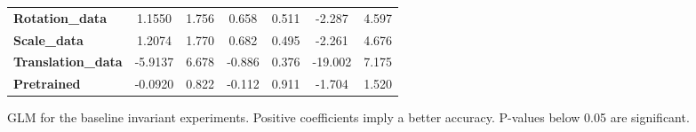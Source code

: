 \begin{figure}[!htb]
\begin{center}
\begin{tabular}{lcccccc}
			\textbf{Rotation\_data}    &       1.1550  &        1.756     &     0.658  &         0.511        &       -2.287    &        4.597     \\
			\textbf{Scale\_data}       &       1.2074  &        1.770     &     0.682  &         0.495        &       -2.261    &        4.676     \\
			\textbf{Translation\_data} &      -5.9137  &        6.678     &    -0.886  &         0.376        &      -19.002    &        7.175     \\
			\textbf{Pretrained}        &      -0.0920  &        0.822     &    -0.112  &         0.911        &       -1.704    &        1.520     \\
			\bottomrule
		\end{tabular}
	\end{center}
	\caption{GLM for the baseline invariant experiments. Positive coefficients imply a better accuracy. P-values below 0.05 are significant.}
	\label{fig:GLM_invariances}
\end{figure}

